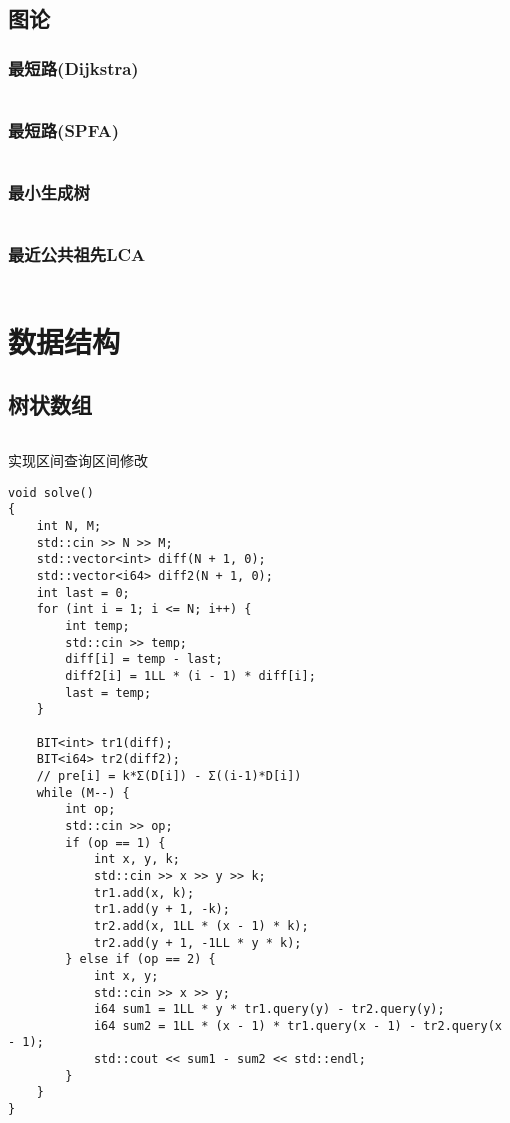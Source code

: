 \documentclass[a4paper, 10pt]{paper}
\newcommand{\cpp}[1]{\inputminted[frame=single, linenos=true]{cpp}{#1}}
\begin{document}
        \subsection{图论}
        \subsubsection{最短路(Dijkstra)}
        \cpp{../dijkstra.cpp}

        \subsubsection{最短路(SPFA)}
        \cpp{../SPFA.cpp}

        \subsubsection{最小生成树}
        \cpp{../dijkstra.cpp}

        \subsubsection{最近公共祖先LCA}
        \cpp{../最近公共祖先_LCA.cpp}

    \section{数据结构}
        \subsection{树状数组}
        \cpp{../BIT.cpp}
        实现区间查询区间修改
        \begin{verbatim}
void solve()
{
    int N, M;
    std::cin >> N >> M;
    std::vector<int> diff(N + 1, 0);
    std::vector<i64> diff2(N + 1, 0);
    int last = 0;
    for (int i = 1; i <= N; i++) {
        int temp;
        std::cin >> temp;
        diff[i] = temp - last;
        diff2[i] = 1LL * (i - 1) * diff[i];
        last = temp;
    }

    BIT<int> tr1(diff);
    BIT<i64> tr2(diff2);
    // pre[i] = k*Σ(D[i]) - Σ((i-1)*D[i])
    while (M--) {
        int op;
        std::cin >> op;
        if (op == 1) {
            int x, y, k;
            std::cin >> x >> y >> k;
            tr1.add(x, k);
            tr1.add(y + 1, -k);
            tr2.add(x, 1LL * (x - 1) * k);
            tr2.add(y + 1, -1LL * y * k);
        } else if (op == 2) {
            int x, y;
            std::cin >> x >> y;
            i64 sum1 = 1LL * y * tr1.query(y) - tr2.query(y);
            i64 sum2 = 1LL * (x - 1) * tr1.query(x - 1) - tr2.query(x - 1);
            std::cout << sum1 - sum2 << std::endl;
        }
    }
}
        \end{verbatim}
\end{document}
